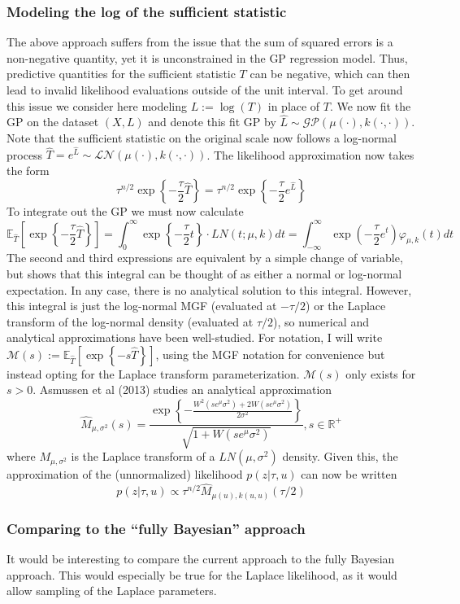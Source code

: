 \documentclass[12pt]{article}
\newcommand{\E}{\mathbb{E}}
\newcommand{\R}{\mathcal{R}}
\def\R{\mathbb{R}}
\begin{document}
\subsubsection{Modeling the log of the sufficient statistic}
The above approach suffers from the issue that the sum of squared errors is a non-negative quantity, yet it is unconstrained in the GP regression model. Thus, predictive quantities for the 
sufficient statistic $T$ can be negative, which can then lead to invalid likelihood evaluations outside of the unit interval. To get around this issue we consider here modeling $L := \log(T)$ in place 
of $T$. We now fit the GP on the dataset $(X, L)$ and denote this fit GP by $\hat{L} \sim \mathcal{GP}(\mu(\cdot), k(\cdot, \cdot))$. Note that the sufficient statistic on the original scale now follows
a log-normal process $\hat{T} = e^{\hat{L}} \sim \mathcal{LN}(\mu(\cdot), k(\cdot, \cdot))$. The likelihood approximation now takes the form
\[\tau^{n/2}\exp\left\{-\frac{\tau}{2}\hat{T} \right\} = \tau^{n/2}\exp\left\{-\frac{\tau}{2}e^{\hat{L}} \right\} \]
To integrate out the GP we must now calculate
\[\E_{\hat{T}}\left[\exp\left\{-\frac{\tau}{2}\hat{T} \right\}  \right] = \int_{0}^{\infty} \exp\left\{-\frac{\tau}{2}t \right\} \cdot LN(t; \mu, k) dt = \int_{-\infty}^{\infty} \exp\left(-\frac{\tau}{2}e^t \right) \varphi_{\mu, k}(t) dt\]
The second and third expressions are equivalent by a simple change of variable, but shows that this integral can be thought of as either a normal or log-normal expectation. In any case, there is no analytical 
solution to this integral. However, this integral is just the log-normal MGF (evaluated at $-\tau/2$) or the Laplace transform of the log-normal density (evaluated at $\tau/2$), so numerical and analytical approximations
have been well-studied. For notation, I will write 
$\mathcal{M}(s) := \E_{\hat{T}}\left[\exp\left\{-s\hat{T} \right\}  \right]$, using the MGF notation for convenience but instead opting for the Laplace transform parameterization. $\mathcal{M}(s)$ only exists 
for $s > 0$. Asmussen et al (2013) studies an analytical approximation
\[\hat{M}_{\mu, \sigma^2}(s) = \frac{\exp\left\{-\frac{W^2(se^\mu \sigma^2) + 2W(se^\mu \sigma^2)}{2\sigma^2}\right\}}{\sqrt{1 + W(se^\mu \sigma^2)}}, s \in \R^+\]
where $M_{\mu, \sigma^2}$ is the Laplace transform of a $LN(\mu, \sigma^2)$ density. Given this, the approximation of the (unnormalized) likelihood $p(z|\tau, u)$ can now be written
\[p(z|\tau, u) \propto \tau^{n/2} \hat{M}_{\mu(u), k(u,u)}(\tau/2)\]


\subsubsection{Comparing to the ``fully Bayesian'' approach}
It would be interesting to compare the current approach to the fully Bayesian approach. This would especially be true for the Laplace likelihood, as it would allow sampling of 
the Laplace parameters. 
\end{document}
